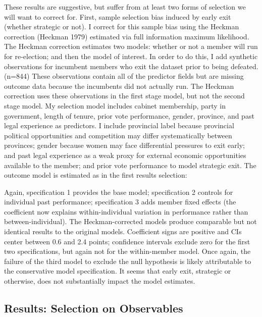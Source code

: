 \documentclass[letter,12pt]{article}
\begin{document}
These results are suggestive, but suffer from at least two forms of selection we will want to correct for. First, sample selection bias induced by early exit (whether strategic or not). I correct for this sample bias using the Heckman correction (Heckman 1979) estimated via full information maximum likelihood. The Heckman correction estimates two models: whether or not a member will run for re-election; and then the model of interest. In order to do this, I add synthetic observations for incumbent members who exit the dataset prior to being defeated. (n=844) These observations contain all of the predictor fields but are missing outcome data because the incumbents did not actually run. The Heckman correction uses these observations in the first stage model, but not the second stage model. My selection model includes cabinet membership, party in government, length of tenure, prior vote performance, gender, province, and past legal experience as predictors. I include provincial label because provincial political opportunities and competition may differ systematically between provinces; gender because women may face differential pressures to exit early; and past legal experience as a weak proxy for external economic opportunities available to the member; and prior vote performance to model strategic exit. The outcome model is estimated as in the first results selection:



Again, specification 1 provides the base model; specification 2 controls for individual past performance; specification 3 adds member fixed effects (the coefficient now explains within-individual variation in performance rather than between-individual). The Heckman-corrected models produce comparable but not identical results to the original models. Coefficient signs are positive and CIs center between 0.6 and 2.4 points; confidence intervals exclude zero for the first two specifications, but again not for the within-member model. Once again, the failure of the third model to exclude the null hypothesis is likely attributable to the conservative model specification. It seems that early exit, strategic or otherwise, does not substantially impact the model estimates.

\subsection*{Results: Selection on Observables}
\end{document}
